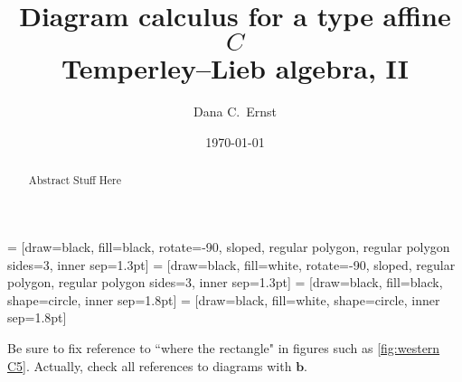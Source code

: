 \documentclass[11pt]{amsart}
\date{\today}
\theoremstyle{definition}
\numberwithin{equation}{section}
\renewcommand{\(}{\left(}
\renewcommand{\)}{\right)}
\begin{document}
 = [draw=black, fill=black, rotate=-90, sloped, regular polygon, regular polygon sides=3, inner sep=1.3pt]
 = [draw=black, fill=white, rotate=-90, sloped, regular polygon, regular polygon sides=3, inner sep=1.3pt]
 = [draw=black, fill=black, shape=circle, inner sep=1.8pt]
 = [draw=black, fill=white, shape=circle, inner sep=1.8pt]

\title[Diagram calculus for a type affine $C$ Temperley--Lieb algebra, II]{Diagram calculus for a type affine $C$ \\ Temperley--Lieb algebra, II}

\author[D.C.~Ernst]{Dana C.~Ernst}
\address{Department of Mathematics and Statistics, Northern Arizona University, Flagstaff, AZ 86011}



\begin{abstract}
Abstract Stuff Here
\end{abstract}

\maketitle



{\color{red}Be sure to fix reference to ``where the rectangle" in figures such as \ref{fig:western C5}. Actually, check all references to diagrams with $\mathbf{b}$.}

\end{document}
